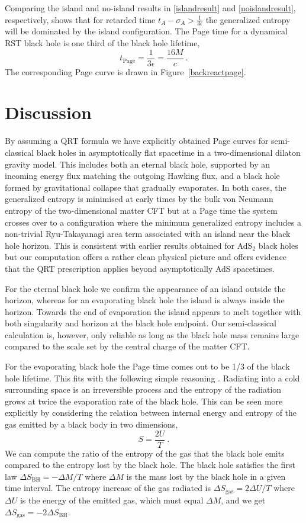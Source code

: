 \documentclass[12pt,a4paper]{article}
\newcommand{\be}{\begin{equation}}
\newcommand{\ee}{\end{equation}}
\newcommand{\f}[2]{\frac{#1}{#2}}
\begin{document}
Comparing the island and no-island results in \eqref{islandresult} and \eqref{noislandresult}, respectively, shows that for retarded time 
$t_A-\sigma_A > \f1{3\epsilon}$ the generalized entropy will be dominated by the island configuration. The Page time for a dynamical RST black hole is one third of the black hole lifetime,
\be\label{RSTpagetime}
t_\text{Page} = \frac1{3\epsilon}=\f{16M}{c} \>.
\ee
The corresponding Page curve is drawn in Figure~\ref{backreactpage}.

%
\section{Discussion}\label{sec:conclusion}
%
By assuming a QRT formula we have explicitly obtained Page curves for semi-classical black holes in asymptotically flat spacetime in a two-dimensional dilaton gravity model. This includes both an eternal black hole, supported by an incoming energy flux matching the outgoing Hawking flux, and a black hole formed by gravitational collapse that gradually evaporates. In both cases, the generalized entropy is minimised at early times by the bulk von Neumann entropy of the two-dimensional matter CFT but at a Page time the system crosses over to a configuration where the minimum generalized entropy includes a non-trivial Ryu-Takayanagi area term associated with an island near the black hole horizon. This is consistent with earlier results obtained for AdS$_2$ black holes but our computation offers a rather clean physical picture and offers evidence that the QRT prescription applies beyond asymptotically AdS spacetimes.

For the eternal black hole we confirm the appearance of an island outside the horizon, whereas for an evaporating black hole the island is always inside the horizon. Towards the end of evaporation the island appears to melt together with both singularity and horizon at the black hole endpoint. Our semi-classical calculation is, however, only reliable as long as the black hole mass remains large compared to the scale set by the central charge of the matter CFT. 

For the evaporating black hole the Page time comes out to be 1/3 of the black hole lifetime. This fits with the following simple reasoning \cite{Zurek:1982zz}. Radiating into a cold surrounding space is an irreversible process and the entropy of the radiation grows at twice the evaporation rate of the black hole. This can be seen more explicitly by considering the relation between internal energy and entropy of the gas emitted by a black body in two dimensions, 
\be
S =  \f{2 U}{T}~.
\ee
We can compute the ratio of the entropy of the gas that the black hole emits compared to the entropy lost by the black hole. The black hole satisfies the first law $\Delta S_\text{BH} = -\Delta M/T$ where $\Delta M$ is the mass lost by the black hole in a given time interval. The entropy increase of the gas radiated is $\Delta S_\text{gas} = 2 \Delta U / T$ where $\Delta U$ is the energy of the emitted gas, which must equal $\Delta M$, and we get $\Delta S_\text{gas} = -2 \Delta S_\text{BH}$.
\end{document}
